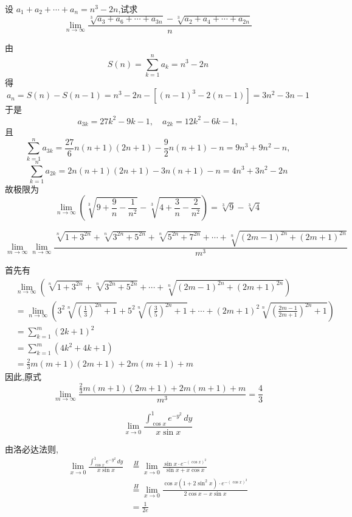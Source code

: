 \begin{questions}
    \question 设 $a_1+a_2+\cdots+a_n=n^3-2n$,试求
    \[
    \lim_{n\to\infty}\frac{\sqrt[3]{a_3+a_6+\cdots+a_{3n}}-\sqrt[3]{a_2+a_4+\cdots+a_{2n}}}{n}
    \]
    \begin{solution}
        由 
        \[
        S(n)=\sum_{k=1}^n a_k=n^3-2n
        \] 
        得
        \[
        a_n=S(n)-S(n-1)=n^3-2n-\left[(n-1)^3-2(n-1)\right]=3n^2-3n-1
        \]
        于是
        \[
        a_{3k}=27k^2-9k-1,\quad a_{2k}=12k^2-6k-1,
        \]
        且
        \[
        \sum_{k=1}^n a_{3k}= \frac{27}{6}n(n+1)(2n+1)-\frac{9}{2}n(n+1)-n=9 n^3 + 9 n^2 - n,
        \]
        \[
        \sum_{k=1}^n a_{2k}= 2n(n+1)(2n+1)-3n(n+1)-n=4 n^3 + 3 n^2 - 2 n
        \]
        故极限为
        \[
        \lim_{n\to\infty}\left(\sqrt[3]{9+\frac{9}{n}-\frac{1}{n^2}}-\sqrt[3]{4+\frac{3}{n}-\frac{2}{n^2}}\right)
        =\sqrt[3]{9}-\sqrt[3]{4}
        \]
    \end{solution}

    \question 
    \[
    \lim_{m\to\infty} \lim_{n\to\infty} \frac{\sqrt[n]{1+3^{2n}}+\sqrt[n]{3^{2n}+5^{2n}}+\sqrt[n]{5^{2n}+7^{2n}}+\cdots+\sqrt[n]{(2m-1)^{2n}+(2m+1)^{2n}}}{m^{3}}
    \]
    \begin{solution}
        首先有
        \begin{align*}
        &\lim_{n\to\infty} \left( \sqrt[n]{1+3^{2n}} +\sqrt[n]{3^{2n}+5^{2n}} + \cdots +\sqrt[n]{(2m-1)^{2n}+(2m+1)^{2n}} \right)\\
        &=\lim_{n\to\infty} \left( 3^2\sqrt[n]{\left(\frac13\right)^{2n}+1} + 5^2\sqrt[n]{\left(\frac35\right)^{2n}+1} + \cdots + (2m+1)^2\sqrt[n]{\left(\frac{2m-1}{2m+1}\right)^{2n}+1} \right)\\
        &= \sum_{k=1}^m (2k+1)^2 \\
        &= \sum_{k=1}^m (4k^2+4k+1) \\
        &=\frac{2}{3}m(m+1)(2m+1) + 2m(m+1) + m
        \end{align*}
        因此,原式
        \[
        \lim_{m\to\infty} \frac{\frac{2}{3}m(m+1)(2m+1) + 2m(m+1) + m}{m^3} = \frac{4}{3}
        \]
    \end{solution}

    \question 
    \[
    \lim_{x \to 0} \frac{\int_{\cos x}^1 e^{-y^2} \, dy}{x \sin x}
    \]
    \begin{solution}
        由洛必达法则,
        \begin{align*}
        \lim_{x \to 0} \frac{\int_{\cos x}^1 e^{-y^2} \, dy}{x \sin x}
        &\overset{H}{=} \lim_{x \to 0} \frac{\sin x \cdot e^{-(\cos x)^2}}{\sin x + x \cos x} \\
        &\overset{H}{=} \lim_{x \to 0} \frac{\cos x(1 + 2\sin^2 x) \cdot e^{-(\cos x)^2}}{2\cos x - x\sin x} \\
        &= \frac{1}{2e}
        \end{align*}
    \end{solution}


\end{questions}
